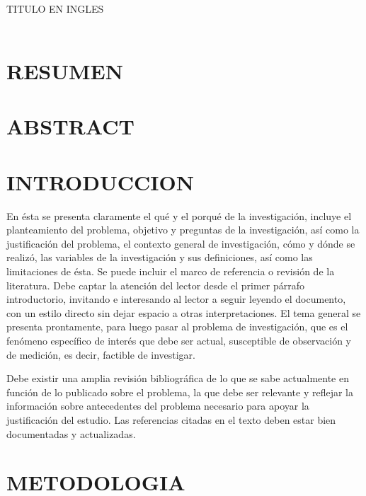 \documentclass[12pt,letterpaper]{report}
\begin{document}
	\caratulaTapa
	\caratulaContenido
	\newpage
	{
	\begin{center}
	{\fontsize{14}{16}\selectfont \MakeUppercase{\Titulo}}\\
	
	\vspace{0.3cm}
	{\fontsize{14}{16}\selectfont \MakeUppercase{Titulo en Ingles}}\\
	
	{\fontsize{12}{14}\selectfont \MakeUppercase{\Autor}}\\
	\end{center}
	\section*{RESUMEN}
	\section*{ABSTRACT}
	\begin{multicols}{2}
	\section*{INTRODUCCION}
	En ésta se presenta claramente el qué y el porqué de la investigación, incluye el planteamiento del problema, objetivo y preguntas de
la investigación, así como la justificación del
problema, el contexto general de investigación,
cómo y dónde se realizó, las variables de la investigación y sus definiciones, así como las limitaciones de ésta. Se puede incluir el marco
de referencia o revisión de la literatura.
Debe captar la atención del lector desde el
primer párrafo introductorio, invitando e interesando al lector a seguir leyendo el documento, con un estilo directo sin dejar espacio
a otras interpretaciones.
El tema general se presenta prontamente,
para luego pasar al problema de investigación,
que es el fenómeno específico de interés que
debe ser actual, susceptible de observación y
de medición, es decir, factible de investigar.

Debe existir una amplia revisión bibliográfica de lo que se sabe actualmente en función
de lo publicado sobre el problema, la que debe
ser relevante y reflejar la información sobre
antecedentes del problema necesario para
apoyar la justificación del estudio. Las referencias citadas en el texto deben estar bien
documentadas y actualizadas.
	\section*{METODOLOGIA}

\end{multicols}}
\end{document}
